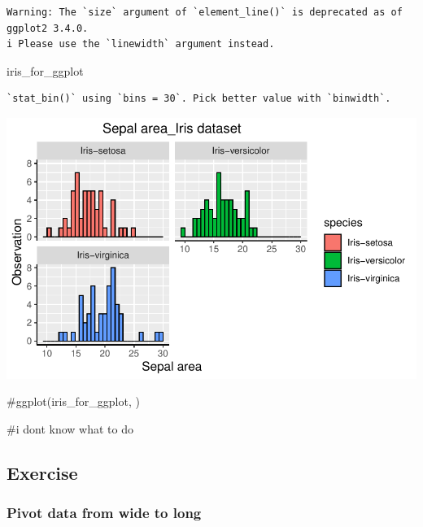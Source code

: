 \documentclass[
  letterpaper,
  DIV=11,
  numbers=noendperiod]{scrartcl}
\newenvironment{Shaded}{\begin{snugshade}}{\end{snugshade}}
\newcommand{\CommentTok}[1]{\textcolor[rgb]{0.37,0.37,0.37}{#1}}
\newcommand{\NormalTok}[1]{\textcolor[rgb]{0.00,0.23,0.31}{#1}}
\begin{document}
\begin{verbatim}
Warning: The `size` argument of `element_line()` is deprecated as of ggplot2 3.4.0.
i Please use the `linewidth` argument instead.
\end{verbatim}

\begin{Shaded}
\begin{Highlighting}[]
\NormalTok{iris\_for\_ggplot}
\end{Highlighting}
\end{Shaded}

\begin{verbatim}
`stat_bin()` using `bins = 30`. Pick better value with `binwidth`.
\end{verbatim}

\includegraphics{AS_day5-tidyverse-template_files/figure-pdf/unnamed-chunk-35-1.pdf}

\begin{Shaded}
\begin{Highlighting}[]
\CommentTok{\#ggplot(iris\_for\_ggplot,  )}

\CommentTok{\#i dont know what to do}
\end{Highlighting}
\end{Shaded}

\subsection{Exercise}\label{exercise-4}

\subsubsection{Pivot data from wide to
long}\label{pivot-data-from-wide-to-long}
\end{document}
